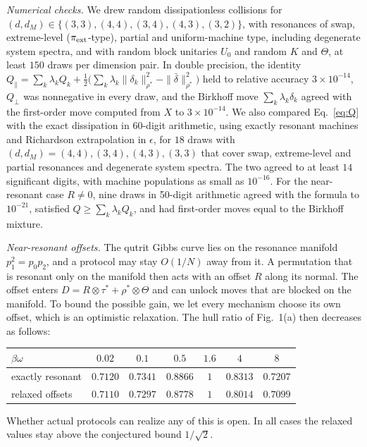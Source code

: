 \documentclass[aps,prl,reprint,superscriptaddress,amsmath,amssymb]{revtex4-2}
\begin{document}
\emph{Numerical checks.} We drew random dissipationless collisions for $(d,d_M)\in\{(3,3),(4,4),(3,4),(4,3),(3,2)\}$,
with resonances of swap, extreme-level ($\pi_{\rm ext}$-type), partial and uniform-machine type, including degenerate
system spectra, and with random block unitaries $U_0$ and random $K$ and $\Theta$, at least $150$ draws per dimension
pair. In double precision, the identity
$Q_\parallel=\sum_k\lambda_kQ_k+\tfrac12\big(\sum_k\lambda_k\|\delta_k\|^2_{\rho^*}-\|\bar\delta\|^2_{\rho^*}\big)$ held to
relative accuracy $3\times10^{-14}$, $Q_\perp$ was nonnegative in every draw, and the Birkhoff move
$\sum_k\lambda_k\delta_k$ agreed with the first-order move computed from $X$ to $3\times10^{-14}$. We also compared
Eq.~\eqref{eq:Q} with the exact dissipation in 60-digit arithmetic, using exactly resonant machines and Richardson
extrapolation in $\epsilon$, for $18$ draws with $(d,d_M)=(4,4),(3,4),(4,3),(3,3)$ that cover swap, extreme-level and
partial resonances and degenerate system spectra. The two agreed to at least $14$ significant digits, with machine
populations as small as $10^{-16}$. For the near-resonant case $R\neq0$, nine draws in 50-digit arithmetic agreed with
the formula to $10^{-21}$, satisfied $Q\geq\sum_k\lambda_kQ_k$, and had first-order moves equal to the Birkhoff mixture.

\emph{Near-resonant offsets.} The qutrit Gibbs curve lies on the resonance manifold $p_1^2=p_0p_2$, and a protocol may
stay $O(1/N)$ away from it. A permutation that is resonant only on the manifold then acts with an offset $R$ along its
normal. The offset enters $D=R\otimes\tau^*+\rho^*\otimes\Theta$ and can unlock moves that are blocked on the manifold.
To bound the possible gain, we let every mechanism choose its own offset, which is an optimistic relaxation. The hull
ratio of Fig.~1(a) then decreases as follows:
\begin{center}
\begin{tabular}{lcccccc}
$\beta\omega$ & $0.02$ & $0.1$ & $0.5$ & $1.6$ & $4$ & $8$\\ \hline
exactly resonant & $0.7120$ & $0.7341$ & $0.8866$ & $1$ & $0.8313$ & $0.7207$\\
relaxed offsets & $0.7110$ & $0.7297$ & $0.8778$ & $1$ & $0.8014$ & $0.7099$
\end{tabular}
\end{center}
Whether actual protocols can realize any of this is open. In all cases the relaxed values stay above the conjectured
bound $1/\sqrt2$.
\end{document}
